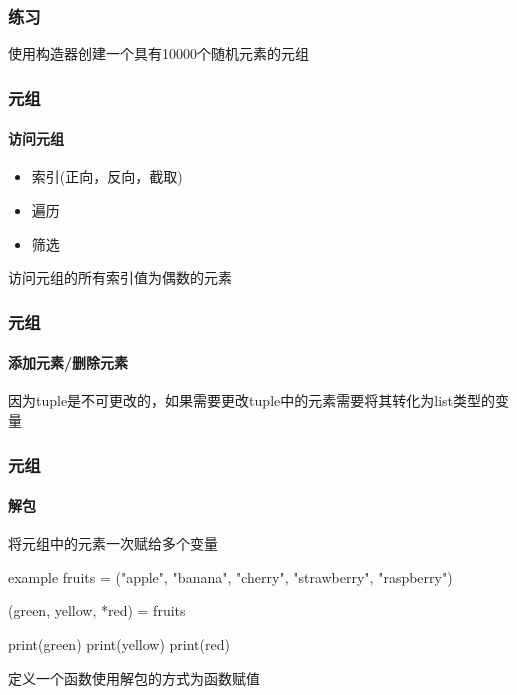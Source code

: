 \documentclass{beamer}
\begin{document}
\begin{frame}[t]
	\frametitle{练习}
	\begin{example}[1]

		使用构造器创建一个具有10000个随机元素的元组
	\end{example}

\end{frame}
\begin{frame}
	\frametitle{元组}
	\framesubtitle{访问元组}
	\begin{itemize}
		\item 索引(正向，反向，截取)
		\item 遍历
		\item 筛选
	\end{itemize}
	\pause
	\begin{example}[1]
		访问元组的所有索引值为偶数的元素
	\end{example}
\end{frame}

\begin{frame}
	\frametitle{元组}
	\framesubtitle{添加元素/删除元素}
	因为tuple是不可更改的，如果需要更改tuple中的元素需要将其转化为list类型的变量

\end{frame}

\begin{frame}
	\frametitle{元组}
	\framesubtitle{解包}
	将元组中的元素一次赋给多个变量
	\begin{block}{example}
		fruits = ("apple", "banana", "cherry", "strawberry", "raspberry")

		(green, yellow, *red) = fruits

		print(green)
		print(yellow)
		print(red)
	\end{block}
	\pause
	\begin{example}[1]
		定义一个函数使用解包的方式为函数赋值
	\end{example}
\end{frame}
\end{document}
